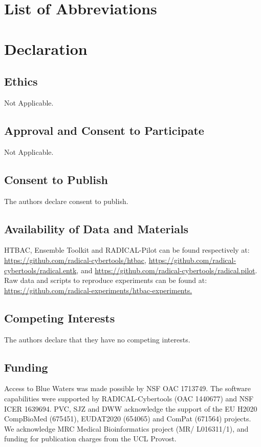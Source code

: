 \documentclass{bmcart}
\begin{document}



\section{List of Abbreviations}\label{sec:abbreviations}

\acuseall

\printacronyms[include-classes=abbrev, name=Abbreviations, heading=none]

\section{Declaration}\label{sec:declarations}

\subsection{Ethics}
Not Applicable. 

\subsection{Approval and Consent to Participate}
Not Applicable. 

\subsection{Consent to Publish}
The authors declare consent to publish. 

\subsection{Availability of Data and Materials}
HTBAC, Ensemble Toolkit and
RADICAL-Pilot can be found respectively at:
\url{https://github.com/radical-cybertools/htbac},
\url{https://github.com/radical-cybertools/radical.entk}, and
\url{https://github.com/radical-cybertools/radical.pilot}. Raw data and
scripts to reproduce experiments can be found at:
\url{https://github.com/radical-experiments/htbac-experiments.}

\subsection{Competing Interests}
The authors declare that they have no competing interests.

\subsection{Funding}
Access to Blue Waters was made possible by NSF OAC 1713749. The software
capabilities were supported by RADICAL-Cybertools (OAC 1440677) and NSF ICER
1639694. PVC, SJZ and DWW acknowledge the support of the EU
H2020 CompBioMed (675451), EUDAT2020 (654065) and ComPat (671564) projects. 
We acknowledge MRC Medical Bioinformatics project (MR/ L016311/1), 
and funding for publication charges from the UCL Provost. 
\end{document}
